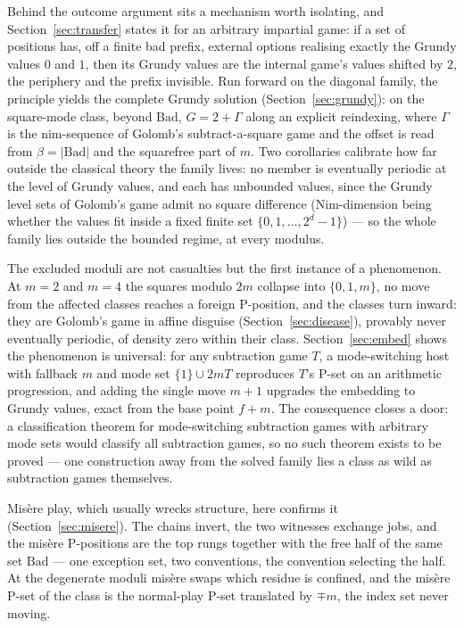 Behind the outcome argument sits a mechanism worth isolating, and
Section~\ref{sec:transfer} states it for an arbitrary impartial game: if
a set of positions has, off a finite bad prefix, external options
realising exactly the Grundy values $0$ and $1$, then its Grundy values
are the internal game's values shifted by $2$, the periphery and the
prefix invisible. Run forward on the diagonal family, the principle
yields the complete Grundy solution (Section~\ref{sec:grundy}): on the
square-mode class, beyond $\mathrm{Bad}$, $G = 2 + \Gamma$ along an
explicit reindexing, where $\Gamma$ is the nim-sequence of Golomb's
subtract-a-square game and the offset is read from
$\beta = |\mathrm{Bad}|$ and the squarefree part of $m$. Two corollaries
calibrate how far outside the classical theory the family lives: no
member is eventually periodic at the level of Grundy values, and each has unbounded values, since the Grundy level sets of Golomb's game
admit no square difference (Nim-dimension being whether the values fit
inside a fixed finite set $\{0, 1, \ldots, 2^d - 1\}$) --- so the whole
family lies outside the bounded regime, at every modulus.

The excluded moduli are not casualties but the first instance of a
phenomenon. At $m = 2$ and $m = 4$ the squares modulo $2m$ collapse into
$\{0, 1, m\}$, no move from the affected classes reaches a foreign
P-position, and the classes turn inward: they are Golomb's game in affine
disguise (Section~\ref{sec:disease}), provably never eventually periodic,
of density zero within their class. Section~\ref{sec:embed} shows the
phenomenon is universal: for any subtraction game $T$, a mode-switching
host with fallback $m$ and mode set $\{1\} \cup 2mT$ reproduces $T$'s
P-set on an arithmetic progression, and adding the single move $m + 1$
upgrades the embedding to Grundy values, exact from the base point
$f + m$. The consequence closes a door: a classification theorem for
mode-switching subtraction games with arbitrary mode sets would classify
all subtraction games, so no such theorem exists to be proved --- one
construction away from the solved family lies a class as wild as
subtraction games themselves.

Mis\`ere play, which usually wrecks structure, here confirms it
(Section~\ref{sec:misere}). The chains invert, the two witnesses exchange
jobs, and the mis\`ere P-positions are the top rungs together with the
free half of the same set $\mathrm{Bad}$ --- one exception set, two
conventions, the convention selecting the half. At the degenerate moduli
mis\`ere swaps which residue is confined, and the mis\`ere P-set of the
class is the normal-play P-set translated by $\mp m$, the index set never
moving.

